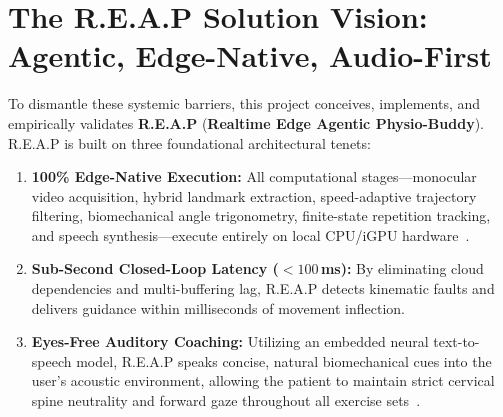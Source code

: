 \documentclass[12pt]{report}
\begin{document}
\section{The R.E.A.P Solution Vision: Agentic, Edge-Native, Audio-First}
To dismantle these systemic barriers, this project conceives, implements, and empirically validates \textbf{R.E.A.P} (\textbf{Realtime Edge Agentic Physio-Buddy}). R.E.A.P is built on three foundational architectural tenets:
\begin{enumerate}
    \item \textbf{100\% Edge-Native Execution:} All computational stages---monocular video acquisition, hybrid landmark extraction, speed-adaptive trajectory filtering, biomechanical angle trigonometry, finite-state repetition tracking, and speech synthesis---execute entirely on local CPU/iGPU hardware~\cite{lugaresi2019mediapipe}.
    \item \textbf{Sub-Second Closed-Loop Latency ($<100$\,ms):} By eliminating cloud dependencies and multi-buffering lag, R.E.A.P detects kinematic faults and delivers guidance within milliseconds of movement inflection.
    \item \textbf{Eyes-Free Auditory Coaching:} Utilizing an embedded neural text-to-speech model, R.E.A.P speaks concise, natural biomechanical cues into the user's acoustic environment, allowing the patient to maintain strict cervical spine neutrality and forward gaze throughout all exercise sets~\cite{sigrist2013augmented}.
\end{enumerate}
\end{document}
